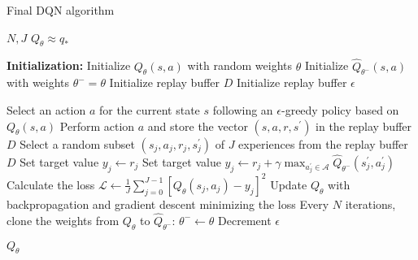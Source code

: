 \begin{algorithm}
\caption{Final DQN algorithm}
\label{alg:dqn2}
\begin{algorithmic}
    \REQUIRE $N, J$
    \ENSURE $Q_\theta \approx q_*$
    \STATE

    \STATE \textbf{Initialization:}
    \STATE Initialize $Q_\theta(s,a)$ with random weights $\theta$
    \STATE Initialize $\hat{Q}_{\theta^-}(s,a)$ with weights $\theta^- = \theta$
    \STATE Initialize replay buffer $D$
    \STATE Initialize replay buffer $\epsilon$
    \STATE
    
            \STATE Select an action $a$ for the current state $s$ following an $\epsilon$-greedy policy based on $Q_\theta(s,a)$
            \STATE Perform action $a$ and store the vector $(s,a,r,s^\prime)$ in the replay buffer $D$
            \STATE Select a random subset $(s_j,a_j,r_j,s^\prime_j)$ of $J$ experiences from the replay buffer $D$
                    \STATE Set target value $y_j \gets r_j$
                \ELSE
                    \STATE Set target value $y_j \gets r_j + \gamma \max_{a^\prime_j \in \mathcal{A}} \hat{Q}_{\theta^-}(s^\prime_j,a^\prime_j)$
                \ENDIF
            \ENDFOR
            \STATE Calculate the loss $\mathcal{L} \gets \frac{1}{J} \sum^{J-1}_{j=0} [Q_\theta(s_j,a_j) - y_j]^2$
            \STATE Update $Q_\theta$ with backpropagation and gradient descent minimizing the loss
            \STATE Every $N$ iterations, clone the weights from $Q_\theta$ to $\hat{Q}_{\theta^-}$: $\theta^- \gets \theta$
            \STATE Decrement $\epsilon$
        \ENDFOR
    \ENDFOR
    \STATE

    \RETURN $Q_\theta$
\end{algorithmic}
\end{algorithm}
